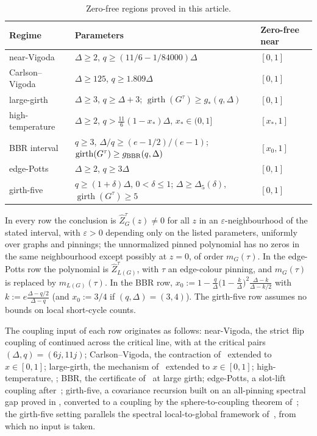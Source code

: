 \documentclass[11pt,reqno]{article}
\theoremstyle{plain}
\theoremstyle{definition}
\theoremstyle{remark}
\newcommand{\eps}{\varepsilon}
\newcommand{\Deg}{\Delta}                        %
\newcommand{\nZpin}[2]{\widehat Z_{#1}^{#2}}
\begin{document}
\begin{table}[H]
\centering
\small
\setlength{\tabcolsep}{7pt}
\renewcommand{\arraystretch}{1.22}
\begin{tabular}{@{}lll@{}}
\toprule
Regime & Parameters & Zero-free near \\
\midrule
near-Vigoda
  & \(\Deg\ge2\), \(q\ge(11/6-1/84000)\Deg\)
  & \([0,1]\) \\
Carlson--Vigoda
  & \(\Deg\ge125\), \(q\ge1.809\Deg\)
  & \([0,1]\) \\
large-girth
  & \(\Deg\ge3\), \(q\ge\Deg+3\); \(\operatorname{girth}(G^\tau)\ge g_*(q,\Deg)\)
  & \([0,1]\) \\
high-temperature
  & \(\Deg\ge2\), \(q>\frac{11}{6}(1-x_*)\Deg\), \(x_*\in(0,1]\)
  & \([x_*,1]\) \\
BBR interval
  & \(q\ge3\), \(\Deg/q\ge(e-1/2)/(e-1)\); \(\operatorname{girth}(G^\tau)\ge g_{\rm BBR}(q,\Deg)\)
  & \([x_0,1]\) \\
edge-Potts
  & \(\Deg\ge2\), \(q\ge3\Deg\)
  & \([0,1]\) \\
girth-five
  & \(q\ge(1+\delta)\Deg\), \(0<\delta\le1\); \(\Deg\ge\Deg_5(\delta)\), \(\operatorname{girth}(G^\tau)\ge5\)
  & \([0,1]\) \\
\bottomrule
\end{tabular}
\smallskip

\parbox{0.97\textwidth}{\raggedright\scriptsize
In every row the conclusion is \(\nZpin{G}{\tau}(z)\ne0\) for all \(z\)
in an \(\eps\)-neighbourhood of the stated interval, with \(\eps>0\)
depending only on the listed parameters, uniformly over graphs and
pinnings; the unnormalized pinned polynomial has no zeros in the same
neighbourhood except possibly at \(z=0\), of order \(m_G(\tau)\).
In the edge-Potts row the polynomial is \(\nZpin{L(G)}{\tau}\), with
\(\tau\) an edge-colour pinning, and \(m_G(\tau)\) is replaced by
\(m_{L(G)}(\tau)\).  In the BBR row,
\(x_0:=1-\frac q\Deg\bigl(1-\frac k\Deg\bigr)^{\!2}
\frac{\Deg-k}{\Deg-k/2}\) with \(k:=e\frac{\Deg-q/2}{\Deg-q}\) (and
\(x_0:=3/4\) if \((q,\Deg)=(3,4)\)).  The girth-five row assumes no
bounds on local short-cycle counts.}
\caption{Zero-free regions proved in this article.}
\label{tab:appendix-extensions}
\end{table}

The coupling input of each row originates as follows: near-Vigoda, the
strict flip coupling of \cite{ShaoShi2026CI2ZF} continued across the
critical line, with \cite[Theorem~20]{CFFGZZ2024} at the critical pairs
\((\Deg,q)=(6j,11j)\); Carlson--Vigoda, the contraction
of~\cite{CarlsonVigoda2024} extended to \(x\in[0,1]\); large-girth, the
mechanism of~\cite{CLMM2023} extended to \(x\in[0,1]\);
high-temperature, ; BBR, the certificate
of~\cite{BencsBerrekkalRegts2025Trees} at large girth; edge-Potts, a
slot-lift coupling after~\cite{CWZZ2025}; girth-five, a covariance
recursion built on an all-pinning spectral gap proved in
, converted to a coupling by the
sphere-to-coupling theorem of~\cite[Lemma~5.13]{CLMM2023}; the
girth-five setting parallels the spectral local-to-global framework
of~\cite{ChenLiu2026LocalGlobal}, from which no input is taken.
\end{document}
